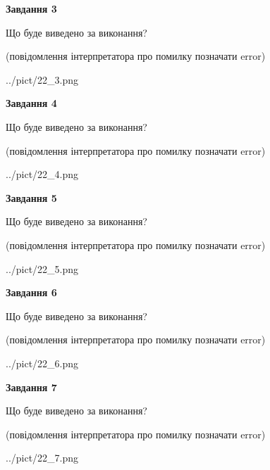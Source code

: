 \documentclass[12pt, ukrainian]{article}
\begin{document}
{\begin {large}
{\begin {center}\textbf{Завдання 3}\end {center}}\par
Що буде виведено за виконання?\par
 (повідомлення інтерпретатора про помилку позначати error)\par
\begin{center}
	{../pict/22_3.png}
\end{center}
\newpage

{\begin {center}\textbf{Завдання 4}\end {center}}\par
Що буде виведено за виконання?\par
 (повідомлення інтерпретатора про помилку позначати error)\par
\begin{center}
	{../pict/22_4.png}
\end{center}
\newpage

{\begin {center}\textbf{Завдання 5}\end {center}}\par
Що буде виведено за виконання?\par
 (повідомлення інтерпретатора про помилку позначати error)\par
\begin{center}
	{../pict/22_5.png}
\end{center}
\newpage

{\begin {center}\textbf{Завдання 6}\end {center}}\par
Що буде виведено за виконання?\par
 (повідомлення інтерпретатора про помилку позначати error)\par
\begin{center}
	{../pict/22_6.png}
\end{center}
\newpage

{\begin {center}\textbf{Завдання 7}\end {center}}\par
Що буде виведено за виконання?\par
 (повідомлення інтерпретатора про помилку позначати error)\par
\begin{center}
	{../pict/22_7.png}
\end{center}
\newpage


\end{large}}
\end{document}
